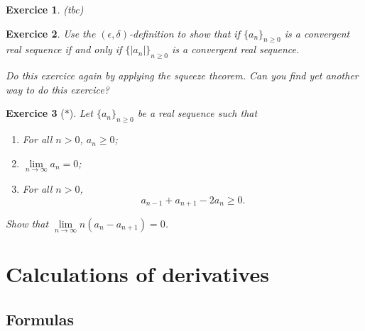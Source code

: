 \documentclass[
	fontsize=10pt, %
	twoside=true, %
	secnumdepth=1, %
	numbers=noenddot, %
]{kaobook}
\newtheorem{exer}{Exercice}[chapter]
\begin{document}
\begin{exer}
(tbc)
\end{exer}

\begin{exer}
Use the $(\epsilon,\delta)$-definition to show that if $\{a_n\}_{n\geq 0}$ is a convergent real sequence if and only if $\{|a_n|\}_{n\geq 0}$ is a convergent real sequence.

Do this exercice again by applying the squeeze theorem. Can you find yet another way to do this exercice?
\end{exer}

\begin{exer}[$\ast$]
Let $\{a_n\}_{n\geq 0}$ be a real sequence such that
\begin{enumerate}
	\item For all $n>0$, $a_n\geq 0$;
	\item $\lim\limits_{n\to\infty}a_n=0$;
	\item For all $n>0$,
	\begin{equation*}
	a_{n-1}+a_{n+1}-2a_n\geq 0.
	\end{equation*}
\end{enumerate}
Show that $\lim\limits_{n\to\infty}n(a_n-a_{n+1})=0$.
\end{exer}









































\chapter{Calculations of derivatives}

\section{Formulas}
\end{document}
